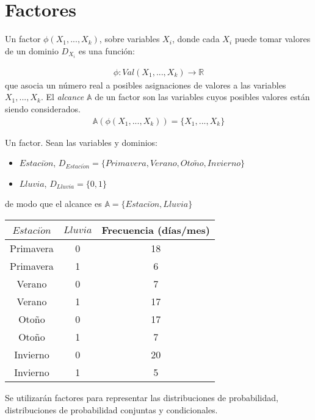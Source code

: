\chapter{Factores}

\begin{definition}[Factor]
Un factor $\phi(X_1,...,X_k)$, sobre variables $X_i$, donde cada $X_i$ puede tomar valores de un dominio $D_{X_i}$ es una función:

\begin{align}
 \phi : Val(X_1,...,X_k) \rightarrow \mathbb{R}
\end{align}
que asocia un número real a posibles asignaciones de valores a las variables $X_1,...,X_k$.  El \emph{alcance} $\mathbb{A}$ de un factor son las variables cuyos posibles valores están siendo considerados.
\begin{align}
 \mathbb{A}(\phi(X_1,...,X_k)) = \{X_1,...,X_k\}
\end{align}
\end{definition}


\begin{example}
Un factor.  Sean las variables y dominios:
\begin{itemize}
 \item $Estaci\acute{o}n$, $D_{Estaci\acute{o}n}=\{Primavera, Verano, Oto\tilde{n}o,Invierno\}$
 
 \item $Lluvia$, $D_{Lluvia}=\{0,1\}$
\end{itemize}
de modo que el alcance es $\mathbb{A} = \{Estaci\acute{o}n, Lluvia\}$

\begin{center}
\begin{tabular}{cc|c}
 $Estaci\acute{o}n$ & $Lluvia$ & Frecuencia (días/mes) \\ \hline
 Primavera & 0 & 18 \\
 Primavera & 1 & 6 \\
 Verano & 0 & 7 \\
 Verano & 1 & 17 \\
 Otoño & 0 & 17 \\
 Otoño & 1 & 7 \\
 Invierno & 0 & 20 \\
 Invierno & 1 & 5 \\
\end{tabular}
\end{center}
\end{example}


Se utilizarán factores para representar las distribuciones de probabilidad, distribuciones de probabilidad conjuntas y condicionales.

